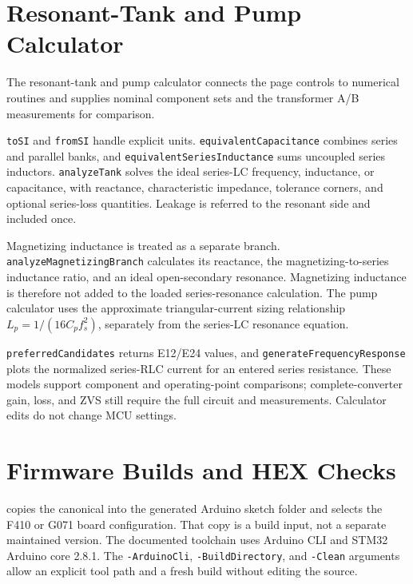 \section{Resonant-Tank and Pump Calculator}
\label{sec:app-calculator-snapshot}

The resonant-tank and pump calculator connects the page controls to numerical routines and supplies nominal component sets and the transformer A/B measurements for comparison.

\texttt{toSI} and \texttt{fromSI} handle explicit units. \texttt{equivalentCapacitance} combines series and parallel banks, and \texttt{equivalentSeriesInductance} sums uncoupled series inductors. \texttt{analyzeTank} solves the ideal series-LC frequency, inductance, or capacitance, with reactance, characteristic impedance, tolerance corners, and optional series-loss quantities. Leakage is referred to the resonant side and included once.

Magnetizing inductance is treated as a separate branch. \texttt{analyzeMagnetizingBranch} calculates its reactance, the magnetizing-to-series inductance ratio, and an ideal open-secondary resonance. Magnetizing inductance is therefore not added to the loaded series-resonance calculation. The pump calculator uses the approximate triangular-current sizing relationship \(L_p=1/(16C_p f_s^2)\), separately from the series-LC resonance equation.

\texttt{preferredCandidates} returns E12/E24 values, and \texttt{generateFrequencyResponse} plots the normalized series-RLC current for an entered series resistance. These models support component and operating-point comparisons; complete-converter gain, loss, and ZVS still require the full circuit and measurements. Calculator edits do not change MCU settings.

\section{Firmware Builds and HEX Checks}
\label{sec:app-firmware-build-tools}

 copies the canonical
 into the generated Arduino sketch
folder and selects the F410 or G071 board configuration. That copy is
a build input, not a separate maintained version. The documented toolchain
uses Arduino CLI and STM32 Arduino core 2.8.1. The \texttt{-ArduinoCli},
\texttt{-BuildDirectory}, and \texttt{-Clean} arguments allow an
explicit tool path and a fresh build without editing the source.

